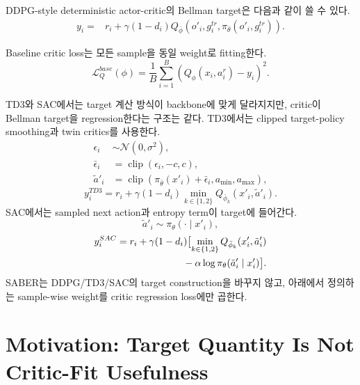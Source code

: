 \documentclass[letterpaper]{article}
\begin{document}
DDPG-style deterministic actor-critic의 Bellman target은 다음과 같이 쓸 수 있다.
\begin{equation}
\begin{aligned}
y_i ={}& r_i
+ \gamma(1-d_i)
Q_{\bar\phi}(o'_i,g_i^{tr},\pi_{\bar\theta}(o'_i,g_i^{tr})).
\end{aligned}
\end{equation}

Baseline critic loss는 모든 sample을 동일 weight로 fitting한다.
\begin{equation}
\mathcal L_Q^{base}(\phi)
=
\frac{1}{B}\sum_{i=1}^{B}
\left(Q_\phi(x_i,a_i^r)-y_i\right)^2.
\end{equation}

TD3와 SAC에서는 target 계산 방식이 backbone에 맞게 달라지지만, critic이 Bellman target을 regression한다는 구조는 같다. TD3에서는 clipped target-policy smoothing과 twin critics를 사용한다.
\begin{equation}
\begin{aligned}
\epsilon_i &\sim \mathcal N(0,\sigma^2),\\
\bar\epsilon_i &= \operatorname{clip}(\epsilon_i,-c,c),\\
\tilde a'_i &=
\operatorname{clip}\left(
\pi_{\bar\theta}(x'_i)+\bar\epsilon_i,
a_{\min},a_{\max}
\right),
\end{aligned}
\end{equation}
\begin{equation}
y_i^{TD3}=r_i+\gamma(1-d_i)
\min_{k\in\{1,2\}}Q_{\bar\phi_k}(x'_i,\tilde a'_i).
\end{equation}
SAC에서는 sampled next action과 entropy term이 target에 들어간다.
\begin{equation}
\tilde a'_i\sim\pi_\theta(\cdot\mid x'_i),
\end{equation}
\begin{equation}
\begin{aligned}
y_i^{SAC}={}&r_i+\gamma(1-d_i)\bigl[
\min_{k\in\{1,2\}}Q_{\bar\phi_k}(x'_i,\tilde a'_i)\\
&\hspace{5.5em}-\alpha\log\pi_\theta(\tilde a'_i\mid x'_i)\bigr].
\end{aligned}
\end{equation}
SABER는 DDPG/TD3/SAC의 target construction을 바꾸지 않고, 아래에서 정의하는 sample-wise weight를 critic regression loss에만 곱한다.

\section{Motivation: Target Quantity Is Not Critic-Fit Usefulness}
\end{document}
